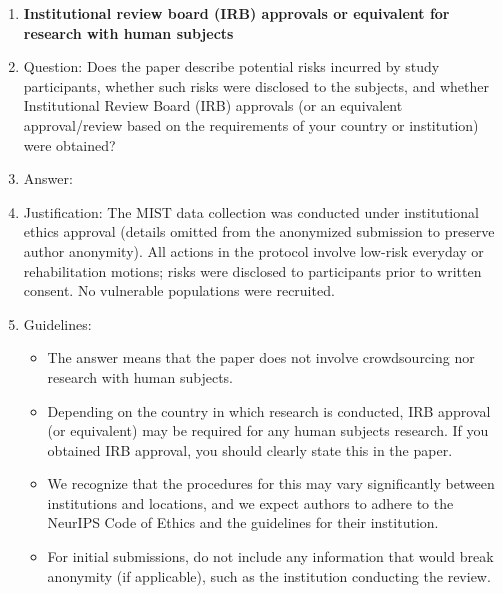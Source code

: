 \begin{enumerate}
\item {\bf Institutional review board (IRB) approvals or equivalent for research with human subjects}
    \item[] Question: Does the paper describe potential risks incurred by study participants, whether such risks were disclosed to the subjects, and whether Institutional Review Board (IRB) approvals (or an equivalent approval/review based on the requirements of your country or institution) were obtained?
    \item[] Answer: \answerYes{}
    \item[] Justification: The MIST data collection was conducted under institutional ethics approval (details omitted from the anonymized submission to preserve author anonymity). All actions in the protocol involve low-risk everyday or rehabilitation motions; risks were disclosed to participants prior to written consent. No vulnerable populations were recruited.
    \item[] Guidelines:
    \begin{itemize}
        \item The answer \answerNA{} means that the paper does not involve crowdsourcing nor research with human subjects.
        \item Depending on the country in which research is conducted, IRB approval (or equivalent) may be required for any human subjects research. If you obtained IRB approval, you should clearly state this in the paper.
        \item We recognize that the procedures for this may vary significantly between institutions and locations, and we expect authors to adhere to the NeurIPS Code of Ethics and the guidelines for their institution.
        \item For initial submissions, do not include any information that would break anonymity (if applicable), such as the institution conducting the review.
    \end{itemize}


\end{enumerate}
